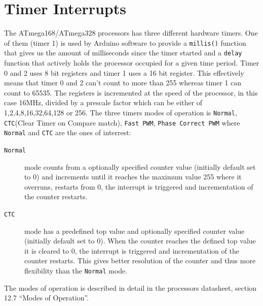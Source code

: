 \documentclass[a4paper,oneside, draft]{memoir}
\begin{document}

\section{Timer Interrupts}


The ATmega168/ATmega328 processors has three different hardware
timers. One of them (timer 1) is used by Arduino software to provide a
\texttt{millis()} function that gives us the amount of milliseconds
since the timer started and a \texttt{delay} function that actively
holds the processor occupied for a given time period. Timer 0 and 2
uses 8 bit registers and timer 1 uses a 16 bit register. This
effectively means that timer 0 and 2 can't count to more than 255
whereas timer 1 can count to 65535. The registers is incremented at
the speed of the processor, in this case 16MHz, divided by a prescale
factor which can be either of 1,2,4,8,16,32,64,128 or 256. The three
timers modes of operation is \texttt{Normal}, \texttt{CTC}(Clear Timer
on Compare match), \texttt{Fast PWM}, \texttt{Phase Correct PWM} where
\texttt{Normal} and \texttt{CTC} are the ones of
interrest: 



\begin{description}
\item[\texttt{Normal}] mode counts from a optionally specified counter
  value (initially default set to 0) and increments until it reaches
  the maximum value 255 where it overruns, restarts from 0, the
  interrupt is triggered and incrementation of the counter
  restarts.

\item[\texttt{CTC}] mode has a predefined top value and optionally
  specified counter value (initially default set to 0). When the
  counter reaches the defined top value it is cleared to 0, the
  interrupt is triggered and incrementation of the counter
  restarts. This gives better resolution of the counter and thus more
  flexibility than the \texttt{Normal} mode.
\end{description}

The modes of operation is described in detail in the processors
datasheet, section 12.7 ``Modes of Operation''.

\end{document}
